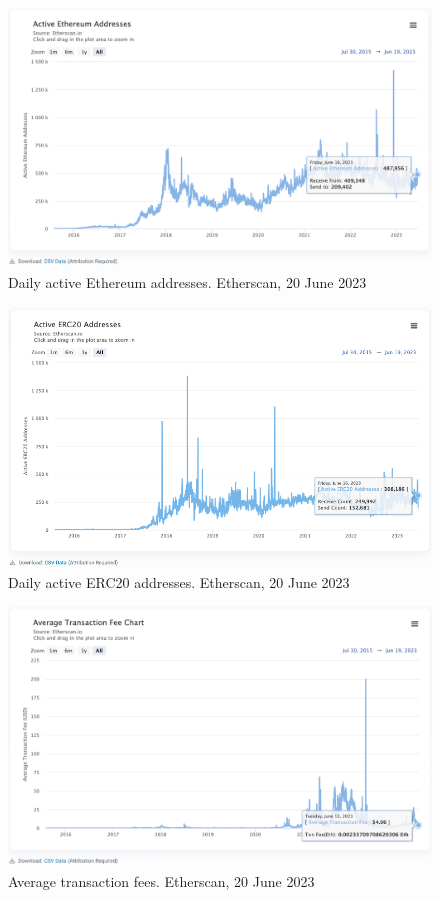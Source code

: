 \documentclass[UTF8]{article}
\begin{document}
{\begin{figure}[htbp]
\begin{center}
\includegraphics[width=0.9\linewidth]{images/ethactiv}
\caption{Daily active Ethereum addresses. Etherscan, 20 June 2023}
\label{fig:ethactiv}
\end{center}
\end{figure}

\begin{figure}[htbp]
\begin{center}
\includegraphics[width=0.9\linewidth]{images/ethactiv20}
\caption{Daily active ERC20 addresses. Etherscan, 20 June 2023}
\label{fig:ethactiv20}
\end{center}
\end{figure}

\begin{figure}[htbp]
\begin{center}
\includegraphics[width=0.9\linewidth]{images/ethtxnfee}
\caption{Average transaction fees. Etherscan, 20 June 2023}
\label{fig:ethtxnfee}
\end{center}
\end{figure}

}
\end{document}
